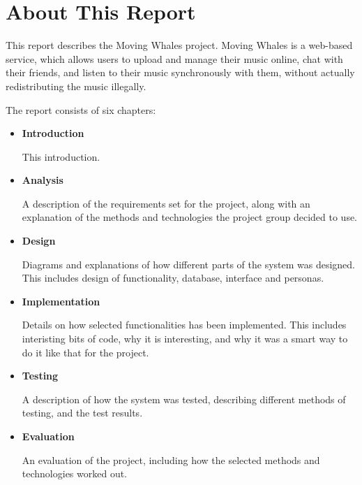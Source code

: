 \section{About This Report}
This report describes the Moving Whales project. Moving Whales is a web-based
service, which allows users to upload and manage their music online, chat with
their friends, and listen to their music synchronously with them, without
actually redistributing the music illegally.

The report consists of six chapters:
\begin{itemize}
  \item{\textbf{Introduction}}
  
  This introduction.
  \item{\textbf{Analysis}}
  
  A description of the requirements set for the project, along with an explanation
  of the methods and technologies the project group decided to use.
  \item{\textbf{Design}}
  
  Diagrams and explanations of how different parts of the system was designed.
  This includes design of functionality, database, interface and personas.
  \item{\textbf{Implementation}}
  
  Details on how selected functionalities has been implemented. This includes
  interisting bits of code, why it is interesting, and why it was a smart way
  to do it like that for the project.
  \item{\textbf{Testing}}
  
  A description of how the system was tested, describing different methods of
  testing, and the test results.
  \item{\textbf{Evaluation}}
  
  An evaluation of the project, including how the selected methods and
  technologies worked out.
\end{itemize}